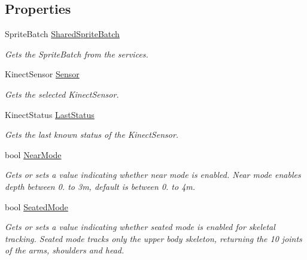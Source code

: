 \subsection*{Properties}
\begin{DoxyCompactItemize}
\item 
Sprite\+Batch \hyperlink{class_microsoft_1_1_samples_1_1_kinect_1_1_avateering_1_1_kinect_chooser_a0a11686b3a34bd60af0322f281743c49}{Shared\+Sprite\+Batch}
\begin{DoxyCompactList}\small\item\em Gets the Sprite\+Batch from the services. \end{DoxyCompactList}\item 
Kinect\+Sensor \hyperlink{class_microsoft_1_1_samples_1_1_kinect_1_1_avateering_1_1_kinect_chooser_a6b75400ac959ae1dca6df7361c9d70c7}{Sensor}
\begin{DoxyCompactList}\small\item\em Gets the selected Kinect\+Sensor. \end{DoxyCompactList}\item 
Kinect\+Status \hyperlink{class_microsoft_1_1_samples_1_1_kinect_1_1_avateering_1_1_kinect_chooser_aca4cdae78c86075fc6231d089874eb19}{Last\+Status}
\begin{DoxyCompactList}\small\item\em Gets the last known status of the Kinect\+Sensor. \end{DoxyCompactList}\item 
bool \hyperlink{class_microsoft_1_1_samples_1_1_kinect_1_1_avateering_1_1_kinect_chooser_a18582629cc383f05b349184f3445e46c}{Near\+Mode}
\begin{DoxyCompactList}\small\item\em Gets or sets a value indicating whether near mode is enabled. Near mode enables depth between 0. to 3m, default is between 0. to 4m. \end{DoxyCompactList}\item 
bool \hyperlink{class_microsoft_1_1_samples_1_1_kinect_1_1_avateering_1_1_kinect_chooser_abcf49a8b0d0d77bfed8bcc4ff32c9cb5}{Seated\+Mode}
\begin{DoxyCompactList}\small\item\em Gets or sets a value indicating whether seated mode is enabled for skeletal tracking. Seated mode tracks only the upper body skeleton, returning the 10 joints of the arms, shoulders and head. \end{DoxyCompactList}\end{DoxyCompactItemize}


